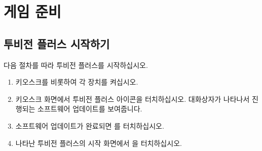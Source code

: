 \documentclass[10pt, openright, language=korean]{hzguide}
\begin{document}






\chapter{게임 준비}

\section{투비전 플러스 시작하기}

다음 절차를 따라 투비전 플러스를 시작하십시오.

\begin{enumerate}
\item 키오스크를 비롯하여 각 장치를 켜십시오.
\item 키오스크 화면에서  투비전 플러스 아이콘을 터치하십시오. 대화상자가 나타나서 진행되는 소프트웨어 업데이트를 보여줍니다.
\item 소프트웨어 업데이트가 완료되면 를 터치하십시오.
\item 나타난 투비전 플러스의 시작 화면에서 을 터치하십시오.
\end{enumerate}
\end{document}

